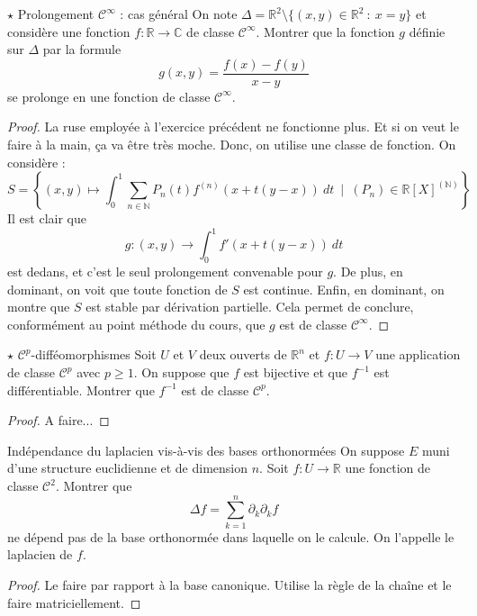 \documentclass[french,a4paper]{article}
\newcommand{\N}{\mathbb{N}}
\newcommand{\R}{\mathbb{R}}
\newcommand{\C}{\mathbb{C}}
\newcommand{\inv}{^{-1}}
\theoremstyle{plain}
\theoremstyle{definition}
\theoremstyle{remark}
\begin{document}
\begin{ex}[Moulin.CD.25]{$\star$ Prolongement $\mathcal{C}^\infty$ : cas général}
	On note $\Delta=\R^2\setminus\{(x,y)\in\R^2\ : \ x=y\}$ et considère une fonction $f:\R\to\C$ de classe $\mathcal{C}^\infty$. Montrer que la fonction $g$ définie sur $\Delta$ par la formule $$g(x,y)=\frac{f(x)-f(y)}{x-y}$$ se prolonge en une fonction de classe $\mathcal{C}^\infty$.
\end{ex}
\begin{proof}
	La ruse employée à l'exercice précédent ne fonctionne plus. Et si on veut le faire à la main, ça va être très moche. Donc, on utilise une classe de fonction. On considère : $$S=\left\{(x,y)\mapsto\int_{0}^{1}\sum_{n\in\N}P_n(t)f^{(n)}(x+t(y-x))\ dt \ \mid \ (P_n)\in\R[X]^{(\N)}\right\}$$ Il est clair que $$g:(x,y)\to\int_{0}^{1}f'(x+t(y-x))\ dt$$ est dedans, et c'est le seul prolongement convenable pour $g$. De plus, en dominant, on voit que toute fonction de $S$ est continue. Enfin, en dominant, on montre que $S$ est stable par dérivation partielle. Cela permet de conclure, conformément au point méthode du cours, que $g$ est de classe $\mathcal{C}^\infty$.
\end{proof}

\begin{ex}[Moulin.CD.26]{$\star$ $\mathcal{C}^p$-difféomorphismes}
	Soit $U$ et $V$ deux ouverts de $\R^n$ et $f:U\to V$ une application de classe $\mathcal{C}^p$ avec $p\geqslant 1$. On suppose que $f$ est bijective et que $f\inv$ est différentiable. Montrer que $f\inv$ est de classe $\mathcal{C}^p$.
\end{ex}
\begin{proof}
	A faire...
\end{proof}

\begin{ex}[Moulin.CD.27]{Indépendance du laplacien vis-à-vis des bases orthonormées}
	On suppose $E$ muni d'une structure euclidienne et de dimension $n$. Soit $f:U\to\R$ une fonction de classe $\mathcal{C}^2$. Montrer que $$\Delta f=\sum_{k=1}^{n}\partial_k\partial_k f$$ ne dépend pas de la base orthonormée dans laquelle on le calcule. On l'appelle le laplacien de $f$.
\end{ex}
\begin{proof}
	Le faire par rapport à la base canonique. Utilise la règle de la chaîne et le faire matriciellement.
\end{proof}
\end{document}

